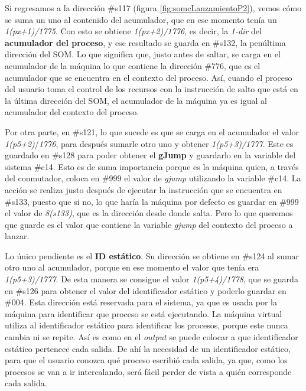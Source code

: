 \documentclass[letterpaper,12pt,oneside]{book}
\begin{document}
		
		Si regresamos a la dirección \#s117 (figura \ref{fig:somcLanzamientoP2}), vemos cómo se suma un uno al contenido del acumulador, que en ese momento
		tenía un \textit{1(px+1)/1775}. Con esto se obtiene \textit{1(px+2)/1776}, es decir, la \textit{1-dir} del \textbf{acumulador del proceso}, y ese resultado se guarda
		en \#s132, la penúltima dirección del SOM. Lo que significa que, justo antes de saltar, se carga en el acumulador de la máquina lo que contiene
		la dirección \#776, que es el acumulador que se encuentra en el contexto del proceso. Así, cuando el proceso del usuario toma el control
		de los recursos con la instrucción de salto que está en la última dirección del SOM, el acumulador de la máquina
		ya es igual al acumulador del contexto del proceso.
  
        Por otra parte, en \#s121, lo que sucede es que se carga
		en el acumulador el valor \textit{1(p5+2)}/\textit{1776}, para después sumarle otro uno y obtener \textit{1(p5+3)/1777}. Este es guardado en \#s128 para 
		poder obtener el \textbf{gJump} y guardarlo en la variable del sistema \#c14. Esto es de suma importancia porque es la máquina quien,
		a través del conmutador, coloca en 
		\#999 el valor de \textit{gjump} utilizando la variable \#c14. La acción se realiza justo después
		de ejecutar la instrucción que se encuentra en \#s133, puesto que si no, lo que haría la máquina por defecto es guardar en \#999 el valor de 
		\textit{8(s133)}, que es la dirección desde donde salta. Pero lo que
		queremos que guarde es el valor que contiene la variable \textit{gjump} del contexto del proceso a lanzar.
		
		Lo único pendiente es el \textbf{ID estático}. Su dirección se obtiene en \#s124 al sumar otro uno al acumulador, 
		porque en ese momento el valor que tenía
		era \textit{1(p5+3)/1777}. De esta manera se consigue el valor \textit{1(p5+4)/1778}, que se guarda en \#s126 para obtener el valor del 
		identificador estático y poderlo guardar
		en \#004. Esta dirección está reservada para el sistema, ya que es usada por la máquina para identificar que proceso se está ejecutando.
		La máquina virtual utiliza al
		identificador estático para identificar los procesos, porque este nunca cambia ni se repite. Así es como  en el \textit{output}
		se puede colocar a que identificador estático pertenece cada salida. De ahí la necesidad
		de un identificador estático, para que el usuario conozca qué proceso escribió cada salida, ya que,  como los procesos
		se van a ir intercalando, será fácil
		perder de vista a quién corresponde cada salida.
  
\end{document}
